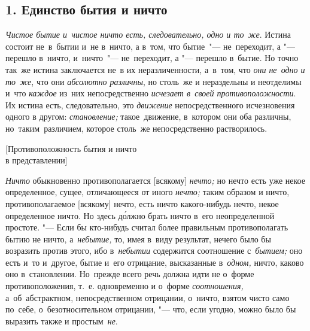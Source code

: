 
\subsection[1. Единство бытия и ничто]{1. Единство бытия и ничто}

{\em Чистое бытие и~чистое ничто есть, следовательно, одно и то~же}. Истина
состоит не~в~бытии и~не в~ничто, а в~том, что бытие~"--- не~переходит, а "---
перешло в~ничто, и~ничто~"--- не~переходит, а "--- перешло в~бытие. Но точно
так~же истина заключается не~в их неразличенности, а~в~том, что
{\em они не~одно и то~же}, что они {\em абсолютно различны}, но столь~же и
нераздельны и неотделимы и~что {\em каждое} из~них непосредственно
{\em исчезает в~своей противоположности}. Их истина есть, следовательно, это
{\em движение} непосредственного исчезновения одного в другом:
{\em становление;} такое~движение, в~котором они оба различны,
но~таким~различием, которое столь~же непосредственно растворилось.

%
{[Противоположность бытия и ничто\nopagebreak\\в представлении]}

{\em Ничто} обыкновенно противополагается [всякому] {\em нечто;} но нечто есть
уже некое определенное, сущее, отличающееся от иного {\em нечто;} таким образом
и ничто, противополагаемое [всякому] нечто, есть ничто какого-нибудь нечто,
некое определенное ничто. Но здесь д\'{о}лжно брать ничто в~его неопределенной
простоте. "--- Если бы кто-нибудь считал более правильным противополагать бытию
не ничто, а~{\em небытие,} то, имея в~виду результат, нечего было бы возразить
против этого, ибо в~{\em небытии} содержится соотношение с~{\em бытием;} оно
есть и~то и~другое, бытие и~его отрицание, высказанные в~{\em одном,} ничто,
каково оно в~становлении. Но~прежде всего речь должна идти не о~форме
противоположения, т.~е. одновременно и о~форме {\em соотношения,}
а~об~абстрактном, непосредственном отрицании, о~ничто, взятом чисто само
по~себе, о~безотносительном отрицании, "--- что, если угодно, можно было бы
выразить также и простым~{\em не}.

